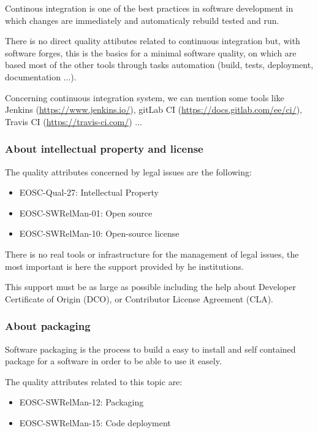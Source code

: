 Continous integration is one of the best practices in software
development in which changes are immediately and automaticaly rebuild
tested and run. 

There is no direct quality attibutes related to continuous integration
but, with software forges, this is the basics for a minimal software quality, on which
are based most of the other tools through tasks automation (build, tests, deployment,
documentation ...).

Concerning continuous integration system, we can mention some tools
like Jenkins (\url{https://www.jenkins.io/}), gitLab CI
(\url{https://docs.gitlab.com/ee/ci/}), Travis CI
(\url{https://travis-ci.com/}) ...

\subsubsection{About intellectual property and license}

The quality attributes concerned by legal issues are the following:
\begin{itemize}
  \item EOSC-Qual-27: Intellectual Property
  \item EOSC-SWRelMan-01: Open source
  \item EOSC-SWRelMan-10: Open-source license
\end{itemize}

There is no real tools or infrastructure for the management of legal
issues, the most important is here the support provided by he
institutions.

This support must be as large as possible including the help about
Developer Certificate of Origin (DCO), or Contributor License
Agreement (CLA).

\subsubsection{About packaging}

Software packaging is the process to build a easy to install and self
contained package for a software in order to be able to use it easely.

The quality attributes related to this topic are:
\begin{itemize}
  \item EOSC-SWRelMan-12: Packaging
  \item EOSC-SWRelMan-15: Code deployment
\end{itemize}

